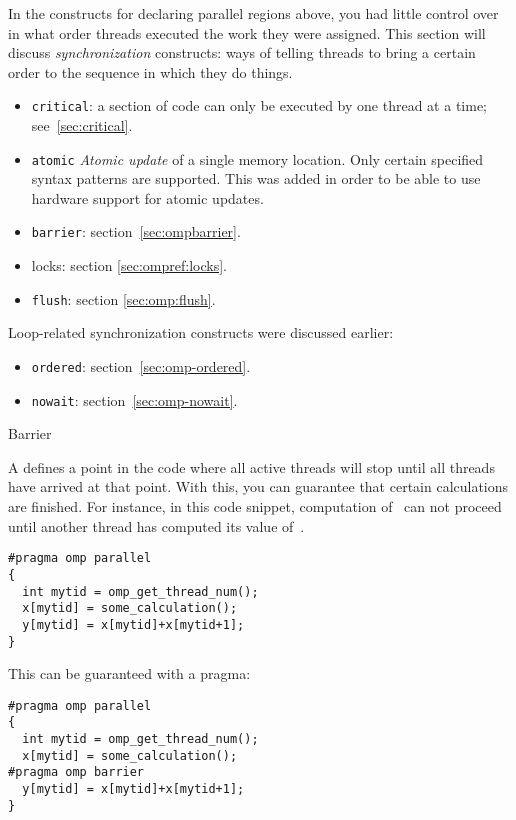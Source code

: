 

In the constructs for declaring parallel regions above, you had little control over 
in what order threads executed the work they were assigned.
This section will discuss \emph{synchronization} constructs: ways of telling
threads to bring a certain order to the sequence in which they do things.

\begin{itemize}
\item \texttt{critical}: a section of code can only be executed by one
  thread at a time; see~\ref{sec:critical}.
\item \texttt{atomic} \emph{Atomic update}
  of a single memory location. Only certain
  specified syntax patterns are supported. This was added in order to
  be able to use hardware support for atomic updates.
\item \texttt{barrier}: section~\ref{sec:ompbarrier}.
\item locks: section \ref{sec:ompref:locks}.
\item \texttt{flush}: section \ref{sec:omp:flush}.
\end{itemize}
Loop-related synchronization constructs were discussed earlier:
\begin{itemize}
\item \texttt{ordered}: section~\ref{sec:omp-ordered}.
\item \texttt{nowait}: section~\ref{sec:omp-nowait}.
\end{itemize}

 {Barrier}
\label{sec:ompbarrier}

A  defines a point in the code where all active threads will stop
until all threads have arrived at that point. With this, you can guarantee that
certain calculations are finished. For instance, in this code snippet, computation 
of~ can not proceed until another thread has computed its value of~.
\begin{lstlisting}
#pragma omp parallel 
{
  int mytid = omp_get_thread_num();
  x[mytid] = some_calculation();
  y[mytid] = x[mytid]+x[mytid+1];
}
\end{lstlisting}
This can be guaranteed with a  pragma:
\begin{lstlisting}
#pragma omp parallel 
{
  int mytid = omp_get_thread_num();
  x[mytid] = some_calculation();
#pragma omp barrier
  y[mytid] = x[mytid]+x[mytid+1];
}
\end{lstlisting}

